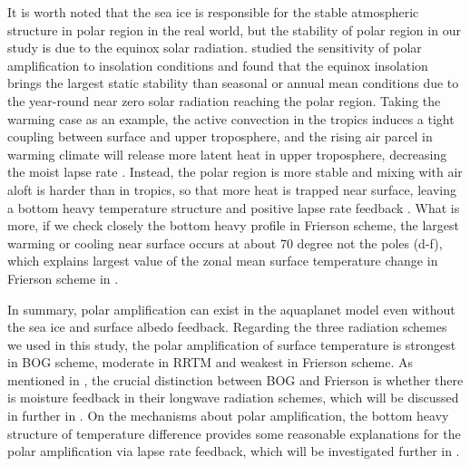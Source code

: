 It is worth noted that the sea ice is responsible for the stable atmospheric structure in polar region in the real world, but the stability of polar region in our study is due to the equinox solar radiation. \cite{Kim2018} studied the sensitivity of polar amplification to insolation conditions and found that the equinox insolation brings the largest static stability than seasonal or annual mean conditions due to the year-round near zero solar radiation reaching the polar region. Taking the warming case as an example, the active convection in the tropics induces a tight coupling between surface and upper troposphere, and the rising air parcel in warming climate will release more latent heat in upper troposphere, decreasing the moist lapse rate \citep{Graversen2014}. Instead, the polar region is more stable and mixing with air aloft is harder than in tropics, so that more heat is trapped near surface, leaving a bottom heavy temperature structure and positive lapse rate feedback \citep{Pithan2014}. What is more, if we check closely the bottom heavy profile in Frierson scheme, the largest warming or cooling near surface occurs at about 70 degree not the poles (d-f), which explains largest value of the zonal mean surface temperature change in Frierson scheme in .


In summary, polar amplification can exist in the aquaplanet model even without the sea ice and surface albedo feedback. Regarding the three radiation schemes we used in this study, the polar amplification of surface temperature is strongest in BOG scheme, moderate in RRTM and weakest in Frierson scheme. As mentioned in , the crucial distinction between BOG and Frierson is whether there is moisture feedback in their longwave radiation schemes, which will be discussed in further in . On the mechanisms about polar amplification, the bottom heavy structure of temperature difference provides some reasonable explanations for the polar amplification via lapse rate feedback, which will be investigated further in .

